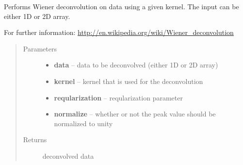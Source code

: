 \documentclass[a4paper,11pt,english]{sphinxmanual}
\begin{document}
\begin{fulllineitems}
\label{analysis:analysis.analyseSpotMeasurements.weinerFilter}
Performs Wiener deconvolution on data using a given kernel. The input can be either 1D or 2D array.

For further information:
\href{http://en.wikipedia.org/wiki/Wiener\_deconvolution}{http://en.wikipedia.org/wiki/Wiener\_deconvolution}
\begin{quote}\begin{description}
\item[{Parameters}] \leavevmode\begin{itemize}
\item {} 
\textbf{data} -- data to be deconvolved (either 1D or 2D array)

\item {} 
\textbf{kernel} -- kernel that is used for the deconvolution

\item {} 
\textbf{reqularization} -- reqularization parameter

\item {} 
\textbf{normalize} -- whether or not the peak value should be normalized to unity

\end{itemize}

\item[{Returns}] \leavevmode
deconvolved data

\end{description}\end{quote}

\end{fulllineitems}

\label{analysis:module-analysis.PSFproperties}
\end{document}
